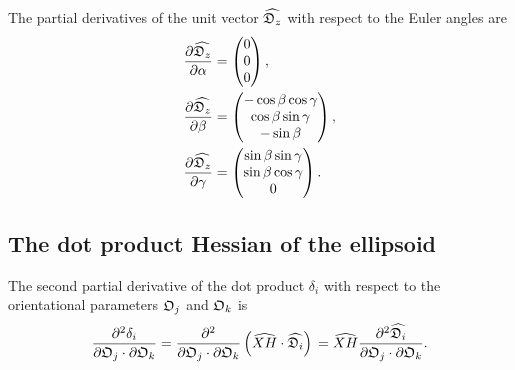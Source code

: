 The partial derivatives of the unit vector $\widehat{\mathfrak{D}_z}$ with respect to the Euler angles are
\begin{subequations}
\begin{align}
    \frac{\partial \widehat{\mathfrak{D}_z}}{\partial \alpha} &= \begin{pmatrix}
        0 \\
        0 \\
        0 \\
    \end{pmatrix}, \\
    \frac{\partial \widehat{\mathfrak{D}_z}}{\partial \beta} &= \begin{pmatrix}
        -\cos \beta \cos \gamma \\
        \cos \beta \sin \gamma \\
        -\sin \beta \\
    \end{pmatrix}, \\
    \frac{\partial \widehat{\mathfrak{D}_z}}{\partial \gamma} &= \begin{pmatrix}
        \sin \beta \sin \gamma \\
        \sin \beta \cos \gamma \\
        0 \\
    \end{pmatrix}.
\end{align}
\end{subequations}




\newpage
\subsection{The dot product Hessian of the ellipsoid}

The second partial derivative of the dot product $\delta_i$ with respect to the orientational parameters $\mathfrak{O}_j$ and $\mathfrak{O}_k$ is
\begin{equation}
    \frac{\partial^2 \delta_i}{\partial \mathfrak{O}_j \cdot \partial \mathfrak{O}_k}
        = \frac{\partial^2}{\partial \mathfrak{O}_j \cdot \partial \mathfrak{O}_k} \left( \widehat{XH} \cdot \widehat{\mathfrak{D}_i} \right) \\
        = \widehat{XH} \frac{\partial^2 \widehat{\mathfrak{D}_i}}{\partial \mathfrak{O}_j \cdot \partial \mathfrak{O}_k}.
\end{equation}



